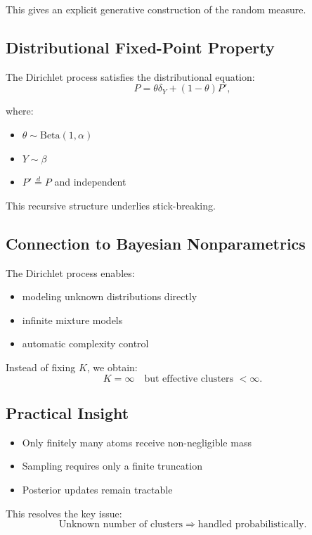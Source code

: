 \documentclass[12pt,oneside]{book}
\numberwithin{equation}{section}
\theoremstyle{definition}
\theoremstyle{plain}
\theoremstyle{remark}
\begin{document}
This gives an explicit generative construction of the random measure.

\subsection*{Distributional Fixed-Point Property}

The Dirichlet process satisfies the distributional equation:
\[
P = \theta \delta_Y + (1 - \theta) P',
\]

where:
\begin{itemize}
\item $\theta \sim \mathrm{Beta}(1, \alpha)$
\item $Y \sim \beta$
\item $P' \stackrel{d}{=} P$ and independent
\end{itemize}

This recursive structure underlies stick-breaking.

\subsection*{Connection to Bayesian Nonparametrics}

The Dirichlet process enables:

\begin{itemize}
\item modeling unknown distributions directly
\item infinite mixture models
\item automatic complexity control
\end{itemize}

Instead of fixing $K$, we obtain:
\[
K = \infty \quad \text{but effective clusters } < \infty.
\]

\subsection*{Practical Insight}

\begin{itemize}
\item Only finitely many atoms receive non-negligible mass
\item Sampling requires only a finite truncation
\item Posterior updates remain tractable
\end{itemize}

This resolves the key issue:
\[
\text{Unknown number of clusters} \Rightarrow \text{handled probabilistically}.
\]
\end{document}
